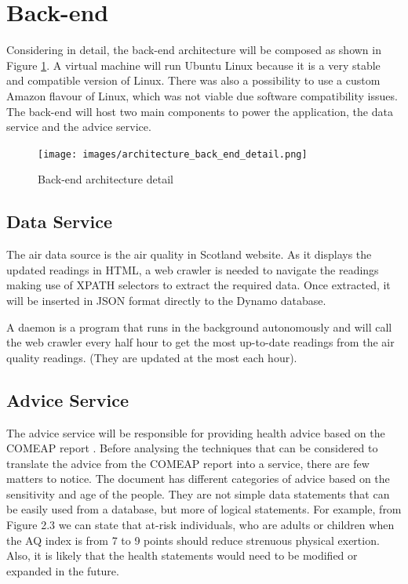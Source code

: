 \section{Back-end}
Considering in detail, the back-end architecture will be composed as shown in Figure \ref{fig:architecture_back_end_detail}. A virtual machine will run Ubuntu Linux because it is a very stable and compatible version of Linux. There was also a possibility to use a custom Amazon flavour of Linux, which was not viable due software compatibility issues. The back-end will host two main components to power the application, the data service and the advice service. 

\begin{figure}[H]
\begin{adjustbox}{width=.6\textwidth,center=\textwidth}
  \centering
  \texttt{[image: images/architecture\_back\_end\_detail.png]}
\end{adjustbox}
  \caption[Back-end architecture]{Back-end architecture detail}
  \label{fig:architecture_back_end_detail}
\end{figure}


\subsection{Data Service}
 The air data source is the air quality in Scotland website. As it displays the updated readings in HTML, a web crawler is needed to navigate the readings making use of XPATH selectors to extract the required data. Once extracted, it will be inserted in JSON format directly to the Dynamo database.
 
A daemon is a program that runs in the background autonomously and will call the web crawler every half hour to get the most up-to-date readings from the air quality readings. (They are updated at the most each hour). 

\subsection{Advice Service}
The advice service will be responsible for providing health advice based on the COMEAP report \cite{HealthProtectionAgencyfortheCommitteeontheMedicalEffectsofAirPollutants2011}. Before analysing the techniques that can be considered to translate the advice from the COMEAP report into a service, there are few matters to notice. The document has different categories of advice based on the sensitivity and age of the people. They are not simple data statements that can be easily used from a database, but more of logical statements. For example, from Figure 2.3 we can state that at-risk individuals, who are adults or children when the AQ index is from 7 to 9 points should reduce strenuous physical exertion. Also, it is likely that the health statements would need to be modified or expanded in the future. 


